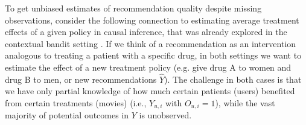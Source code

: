 \documentclass{article}
\newcommand{\user}{u}                       %
\newcommand{\movie}{i}                      %
\newcommand{\ytrue}{Y}                      %
\newcommand{\ytrueelem}[1]{\ytrue_{#1}}
\newcommand{\ytrueum}{\ytrueelem{\user,\movie}}
\newcommand{\ypred}{\hat{Y}}                %
\newcommand{\obs}{O}                        %
\newcommand{\obselem}[1]{\obs_{#1}}
\newcommand{\obsum}{\obselem{\user,\movie}}
\begin{document}
To get unbiased estimates of recommendation quality despite missing observations, consider the following connection to estimating average treatment effects of a given policy in causal inference, that was already explored in the contextual bandit setting \cite{Li2011unbiased,dudik11doublyrobust}. If we think of a recommendation as an intervention analogous to treating a patient with a specific drug, in both settings we want to estimate the effect of a new treatment policy (e.g. give drug A to women and drug B to men, or new recommendations $\ypred$). The challenge in both cases is that we have only partial knowledge of how much certain patients (users) benefited from certain treatments (movies) (i.e., $\ytrueum$ with $\obsum=1$), while the vast majority of potential outcomes in $\ytrue$ is unobserved. 

\begin{table}[tbp]
  \centering
    \vspace*{-2mm}
    \caption{Mean and standard deviation of the Naive, IPS, and SNIPS estimators compared to true MAE and DCG@50 on ML100K. \label{tab:illuexp}}
\end{table}%
\end{document}
